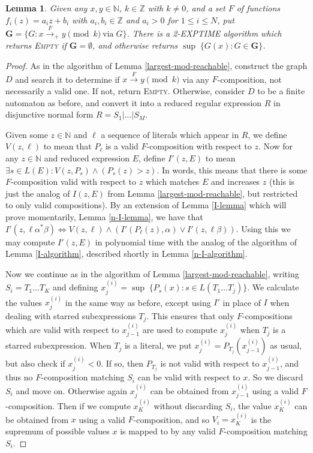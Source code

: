 \documentclass[11pt]{amsart}
\newcommand{\N}{\mathbb{N}}
\newcommand{\Z}{\mathbb{Z}}
\newtheorem{lemma}{Lemma}
\theoremstyle{definition}
\theoremstyle{remark}
\begin{document}
\begin{lemma} \label{n-largest-mod-reachable}
Given any $x, y \in \N$, $k \in \Z$ with $k \ne 0$, and a set $F$ of functions $f_i(z) = a_i z + b_i$ with $a_i, b_i \in \Z$ and $a_i > 0$ for $1 \le i \le N$, put $\mathbf{G} = \{ G : x \xrightarrow{F}_+ y \pmod k \: \text{via} \; G \}$. There is a \textsf{2-EXPTIME} algorithm which returns \textsc{Empty} if $\mathbf{G} = \emptyset$, and otherwise returns $\sup \; \{ G(x) : G \in \mathbf{G} \}$.
\end{lemma}
\begin{proof}
As in the algorithm of Lemma \ref{largest-mod-reachable}, construct the graph $D$ and search it to determine if $x \xrightarrow{F} y \pmod k$ via any $F$-composition, not necessarily a valid one. If not, return \textsc{Empty}. Otherwise, consider $D$ to be a finite automaton as before, and convert it into a reduced regular expression $R$ in disjunctive normal form $R = S_1 | \dots | S_M$.

Given some $z \in \N$ and $\ell$ a sequence of literals which appear in $R$, we define $V(z,\ell)$ to mean that $P_\ell$ is a valid $F$-composition with respect to $z$. Now for any $z \in \N$ and reduced expression $E$, define $I'(z,E)$ to mean $\exists s \in L(E) : V(z, P_s) \land (P_s(z) > z)$. In words, this means that there is some $F$-composition valid with respect to $z$ which matches $E$ and increases $z$ (this is just the analog of $I(z,E)$ from Lemma \ref{largest-mod-reachable}, but restricted to only valid compositions). By an extension of Lemma \ref{I-lemma} which will prove momentarily, Lemma \ref{n-I-lemma}, we have that $I'(z, \ell \alpha^* \beta) \iff V(z, \ell) \land (I'(P_\ell(z), \alpha) \lor I'(z, \ell \beta))$. Using this we may compute $I'(z,E)$ in polynomial time with the analog of the algorithm of Lemma \ref{I-algorithm}, described shortly in Lemma \ref{n-I-algorithm}.

Now we continue as in the algorithm of Lemma \ref{largest-mod-reachable}, writing $S_i = T_1 \dots T_K$ and defining $x^{(i)}_j = \sup \; \{ P_s(x) : s \in L(T_1 \dots T_j) \}$. We calculate the values $x^{(i)}_j$ in the same way as before, except using $I'$ in place of $I$ when dealing with starred subexpressions $T_j$. This ensures that only $F$-compositions which are valid with respect to $x^{(i)}_{j-1}$ are used to compute $x^{(i)}_j$ when $T_j$ is a starred subexpression. When $T_j$ is a literal, we put $x^{(i)}_j = P_{T_j}(x^{(i)}_{j-1})$ as usual, but also check if $x^{(i)}_j < 0$. If so, then $P_{T_j}$ is not valid with respect to $x^{(i)}_{j-1}$, and thus no $F$-composition matching $S_i$ can be valid with respect to $x$. So we discard $S_i$ and move on. Otherwise again $x^{(i)}_j$ can be obtained from $x^{(i)}_{j-1}$ using a valid $F$-composition. Then if we compute $x^{(i)}_K$ without discarding $S_i$, the value $x^{(i)}_K$ can be obtained from $x$ using a valid $F$-composition, and so $V_i = x^{(i)}_K$ is the supremum of possible values $x$ is mapped to by any valid $F$-composition matching $S_i$.


\end{proof}
\end{document}

